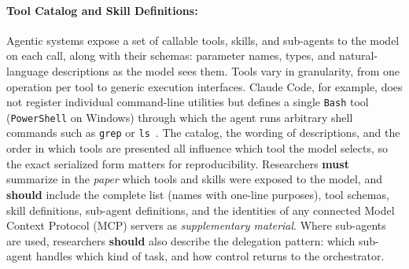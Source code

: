 \documentclass[smallextended]{svjour3}
\newcommand{\must}{\textbf{must}\xspace}
\newcommand{\should}{\textbf{should}\xspace}
\newcommand{\paper}{\emph{paper}\xspace}
\newcommand{\supplementarymaterial}{\emph{supplementary material}\xspace}
\newcommand{\paper}{\emph{paper}\xspace}
\newcommand{\supplementarymaterial}{\emph{supplementary material}\xspace}
\begin{document}
\paragraph{Tool Catalog and Skill Definitions:}
Agentic systems expose a set of callable tools, skills, and sub-agents to the model on each call, along with their schemas: parameter names, types, and natural-language descriptions as the model sees them.
Tools vary in granularity, from one operation per tool to generic execution interfaces.
Claude Code, for example, does not register individual command-line utilities but defines a single \texttt{Bash} tool (\texttt{PowerShell} on Windows) through which the agent runs arbitrary shell commands such as \texttt{grep} or \texttt{ls}~\cite{anthropic_tools_reference}.
The catalog, the wording of descriptions, and the order in which tools are presented all influence which tool the model selects, so the exact serialized form matters for reproducibility.
Researchers \must summarize in the \paper which tools and skills were exposed to the model, and \should include the complete list (names with one-line purposes), tool schemas, skill definitions, sub-agent definitions, and the identities of any connected Model Context Protocol (MCP) servers as \supplementarymaterial.
Where sub-agents are used, researchers \should also describe the delegation pattern: which sub-agent handles which kind of task, and how control returns to the orchestrator.
\end{document}
